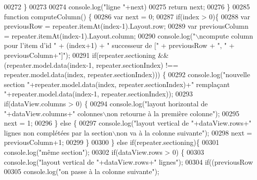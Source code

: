 \begin{DoxyCode}
{00272                 \}
00273 
00274                 console.log(\textcolor{stringliteral}{"ligne "}+next)
00275                 \textcolor{keywordflow}{return} next;
00276             \}
00285             \textcolor{keyword}{function} computeColumn() \{
00286                 var next = 0;
00287                 \textcolor{keywordflow}{if}(index > 0)\{
00288                     var previousRow = repeater.itemAt(index-1).Layout.row;
00289                     var previousColumn = repeater.itemAt(index-1).Layout.column;
00290                     console.log(\textcolor{stringliteral}{"\(\backslash\)ncompute column pour l'item d'id "} + (index+1) + \textcolor{stringliteral}{" successeur de ["} + 
      previousRow + \textcolor{stringliteral}{", "} + previousColumn+\textcolor{stringliteral}{"]"});
00291                     \textcolor{keywordflow}{if}(repeater.sectioning && (repeater.model.data(index-1, repeater.sectionIndex) !== 
      repeater.model.data(index, repeater.sectionIndex))) \{
00292                         console.log(\textcolor{stringliteral}{"nouvelle section "}+repeater.model.data(index, repeater.sectionIndex)+\textcolor{stringliteral}{"
       remplaçant "}+repeater.model.data(index-1, repeater.sectionIndex));
00293                         \textcolor{keywordflow}{if}(dataView.columns > 0) \{
00294                             console.log(\textcolor{stringliteral}{"layout horizontal de "}+dataView.columns+\textcolor{stringliteral}{" colonnes\(\backslash\)non retourne à
       la première colonne"});
00295                             next = 1;
00296                         \} \textcolor{keywordflow}{else} \{
00297                             console.log(\textcolor{stringliteral}{"layout vertical de "}+dataView.rows+\textcolor{stringliteral}{" lignes non complétées par la
       section\(\backslash\)non va à la colonne suivante"});
00298                             next = previousColumn+1;
00299                         \}
00300                     \} \textcolor{keywordflow}{else} \textcolor{keywordflow}{if}(repeater.sectioning)\{
00301                         console.log(\textcolor{stringliteral}{"même section"});
00302                         \textcolor{keywordflow}{if}(dataView.rows > 0) \{
00303                             console.log(\textcolor{stringliteral}{"layout vertical de "}+dataView.rows+\textcolor{stringliteral}{" lignes"});
00304                             \textcolor{keywordflow}{if}((previousRow %
00305                                 console.log(\textcolor{stringliteral}{"on passe à la colonne suivante"});
}
\end{DoxyCode}
